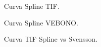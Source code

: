 \begin{figure}[h]
\caption{Curva Spline TIF.}
\end{figure}

\begin{figure}[h]
\caption{Curva Spline VEBONO.}
\end{figure}

\begin{figure}[h]
\caption{Curva TIF Spline vs Svensson.}
\end{figure}

